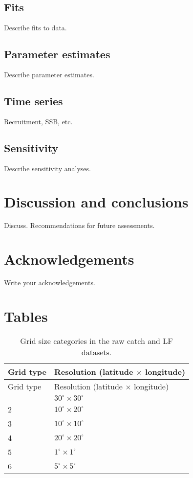 \documentclass[
]{scrartcl}
\begin{document}
\subsection{Fits}\label{fits}

Describe fits to data.

\subsection{Parameter estimates}\label{parameter-estimates}

Describe parameter estimates.

\subsection{Time series}\label{time-series}

Recruitment, SSB, etc.

\subsection{Sensitivity}\label{sensitivity}

Describe sensitivity analyses.

\section{Discussion and conclusions}\label{discussion-and-conclusions}

Discuss. Recommendations for future assessments.

\section{Acknowledgements}\label{acknowledgements}

Write your acknowledgements.

\newpage{}

\section{Tables}\label{tables}

\begin{longtable}[]{@{}ll@{}}
\caption{Grid size categories in the raw catch and LF
datasets.}\label{tbl-grid-size}\tabularnewline
\toprule\noalign{}
Grid type & Resolution (latitude \(\times\) longitude) \\
\midrule\noalign{}
\endfirsthead
\toprule\noalign{}
Grid type & Resolution (latitude \(\times\) longitude) \\
\midrule\noalign{}
\endhead
\bottomrule\noalign{}
\endlastfoot
1 & \(30^\circ\times 30^\circ\) \\
2 & \(10^\circ\times 20^\circ\) \\
3 & \(10^\circ\times 10^\circ\) \\
4 & \(20^\circ\times 20^\circ\) \\
5 & \(1^\circ\times 1^\circ\) \\
6 & \(5^\circ\times 5^\circ\) \\
\end{longtable}
\end{document}
